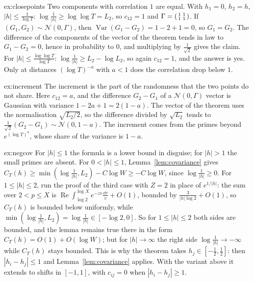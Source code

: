 \begin{solution}{ex:closepoints}
\idea Two components with correlation $1$ are equal.
\writeup With $h_1=0$, $h_2=h$, $|h|\le\frac1{\log T}$: $\log\frac1{|h|}\ge\log\log T=L_2$, so $c_{12}=1$ and $\Gamma=\begin{psmallmatrix}1&1\\1&1\end{psmallmatrix}$. If $(G_1,G_2)\sim\mathcal N(0,\Gamma)$, then $\operatorname{Var}(G_1-G_2)=1-2+1=0$, so $G_1=G_2$. The difference of the components of the vector of the theorem tends in law to $G_1-G_2=0$, hence in probability to $0$, and multiplying by $\frac1{\sqrt2}$ gives the claim. For $|h|\le\frac{\log\log T}{\log T}$: $\log\frac1{|h|}\ge L_2-\log L_2$, so again $c_{12}=1$, and the answer is yes. Only at distances $(\log T)^{-a}$ with $a<1$ does the correlation drop below $1$.
\end{solution}

\begin{solution}{ex:increment}
\idea The increment is the part of the randomness that the two points do not share.
\writeup Here $c_{12}=a$, and the difference $G_2-G_1$ of a $\mathcal N(0,\Gamma)$ vector is Gaussian with variance $1-2a+1=2(1-a)$. The vector of the theorem uses the normalisation $\sqrt{L_2/2}$, so the difference divided by $\sqrt{L_2}$ tends to $\frac1{\sqrt2}(G_2-G_1)\sim\mathcal N(0,1-a)$. The increment comes from the primes beyond $e^{(\log T)^a}$, whose share of the variance is $1-a$.
\end{solution}

\begin{solution}{ex:negcov}
\idea For $|h|\le1$ the formula is a lower bound in disguise; for $|h|>1$ the small primes are absent.
\writeup For $0<|h|\le1$, Lemma~\ref{lem:covariance} gives $C_T(h)\ge\min(\log\frac1{|h|},L_2)-C\log W\ge-C\log W$, since $\log\frac1{|h|}\ge0$. For $1\le|h|\le2$, run the proof of the third case with $Z=2$ in place of $e^{1/|h|}$: the sum over $2<p\le X$ is $\operatorname{Re}\int_{\log2}^{\log X}e^{-zv}\frac{\dd v}v+O(1)$, bounded by $\frac3{|h|\log2}+O(1)$, so $C_T(h)$ is bounded below uniformly, while $\min(\log\frac1{|h|},L_2)=\log\frac1{|h|}\in[-\log2,0]$. So for $1\le|h|\le2$ both sides are bounded, and the lemma remains true there in the form $C_T(h)=O(1)+O(\log W)$; but for $|h|\to\infty$ the right side $\log\frac1{|h|}\to-\infty$ while $C_T(h)$ stays bounded. This is why the theorem takes $h_j\in[-\frac12,\frac12]$: then $|h_i-h_j|\le1$ and Lemma~\ref{lem:covariance} applies. With the variant above it extends to shifts in $[-1,1]$, with $c_{ij}=0$ when $|h_i-h_j|\ge1$.
\end{solution}

